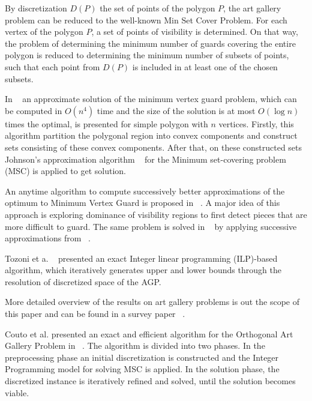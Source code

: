 \documentclass[runningheads,a4paper]{llncs}
\begin{document}
     By discretization $D(P)$ the set of points of the polygon $P$, the art gallery problem can be reduced to the well-known Min Set Cover Problem. For each vertex of the polygon $P$, a set of points of visibility is determined. On that way, the problem of determining the minimum number of guards covering the entire polygon is reduced to determining the minimum number of subsets of points, such that each point from $D(P)$ is included in at least one of the chosen subsets.
     
     
        
     In ~\cite{ghosh2010approximation} an approximate solution of the minimum vertex guard problem, which can be computed in $O(n^4)$ time and the size of the solution is at most $O(\log n)$ times the optimal, is presented for simple polygon with $n$ vertices. Firstly, this algorithm partition the polygonal region into convex components and construct sets consisting of these convex components. After that, on these constructed sets Johnson’s approximation algorithm ~\cite{johnson1974approximation} for the Minimum set-covering problem (MSC) is applied to get solution.
     
     An anytime algorithm to compute successively better approximations of the optimum to Minimum Vertex Guard is proposed in ~\cite{tomas2003approximation}.  A major idea of this approach is exploring dominance of visibility regions to first detect pieces that are
more difficult to guard. The same problem is solved   in ~\cite{tomas2006visibility} by applying successive approximations from  ~\cite{tomas2003approximation}.

Tozoni et a. ~\cite{tozoni2013practical,tozoni2016algorithm}  presented an exact Integer linear programming  (ILP)-based  algorithm, which iteratively generates upper and lower bounds through the resolution of discretized space of the AGP.

More detailed overview of the results on art gallery problems is out the scope of this paper and can be found in a survey paper  ~\cite{ghosh2010approximation2}.

 
    Couto et al. presented an exact and efficient algorithm for the Orthogonal Art Gallery Problem in ~\cite{couto2007exact}. The algorithm is divided into two phases. In the preprocessing phase an initial discretization is constructed and the Integer Programming model for solving MSC is applied.  In the solution phase, the discretized instance is iteratively refined and solved, until the solution becomes viable.
\end{document}
